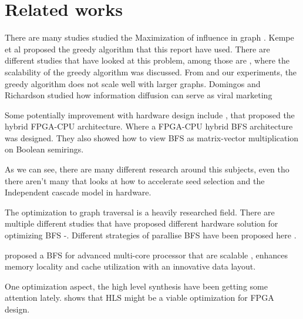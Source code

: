 \chapter{Related works}
There are many studies studied the Maximization of influence in graph \cite{MaximizeSpread2003}.  Kempe et al proposed the greedy algorithm that this report have used. There are different studies that have looked at this problem, among those are \cite{InfluenceMax}, where the scalability of the greedy algorithm was discussed. From \cite{InfluenceMax} and our experiments, the greedy algorithm does not scale well with larger graphs. Domingos and Richardson studied how information diffusion can serve as viral marketing \cite{ViralMarketing}

Some potentially improvement with hardware design include \cite{HybridBFS2015}, that proposed the hybrid FPGA-CPU architecture. Where a FPGA-CPU hybrid BFS architecture was designed. They also showed how to view BFS as matrix-vector multiplication on Boolean semirings. 

As we can see, there are many different research around this subjects, even tho there aren't many that looks at how to accelerate seed selection and the Independent cascade model in hardware.

The optimization to graph traversal is a heavily researched field. There are multiple different studies that have proposed different hardware solution for optimizing BFS \cite{ScalableGraphEx}-\cite{DirectOptimizeBFS}. Different strategies of parallise BFS have been proposed here \cite{ParallelBFS2011}. 

\cite{ScalableGraphEx} proposed a BFS for advanced multi-core processor that are scalable , enhances memory locality and cache utilization with an innovative data layout.

One optimization aspect, the high level synthesis have been getting some attention lately. \cite{HLSready2015} shows that HLS might be a viable optimization for FPGA design. 